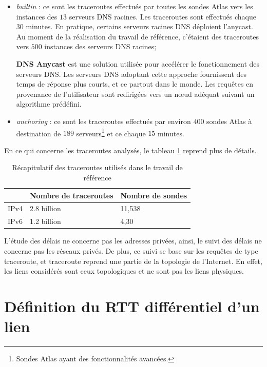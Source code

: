 \begin{itemize}
	\item \textit{builtin} : ce sont les traceroutes effectués par toutes les sondes Atlas vers les instances des  $13$ serveurs DNS racines. Les traceroutes sont effectués chaque $30$ minutes. En pratique, certains serveurs racines DNS déploient l'anycast. Au moment de la réalisation du travail de référence, c'étaient des traceroutes vers $ 500 $ instances des serveurs DNS racines;
	\begin{tcolorbox}
		\textbf{DNS Anycast} est une solution   utilisée pour accélérer le fonctionnement  des serveurs DNS. Les serveurs DNS adoptant cette approche fournissent des temps de réponse plus courts, et ce partout dans le monde. Les requêtes en provenance de l'utilisateur sont redirigées vers un n\oe{}ud adéquat suivant un algorithme prédéfini. 
	\end{tcolorbox}
	
	\item \textit{anchoring} : ce sont les traceroutes effectués par environ $400$ sondes Atlas à destination de $189$ serveurs\footnote{Sondes Atlas ayant des fonctionnalités avancées.} et ce chaque $15$ minutes.
\end{itemize}

En ce qui concerne les traceroutes analysés, le tableau \ref{tab:dataset} reprend plus de détails.

\begin{table}[H]
	\centering
	\begin{tabular}{|l|l|l|}
		\hline
		& \textbf{Nombre de traceroute}s& \textbf{Nombre de sondes}\\ \hline
		IPv4		&2.8 billion & 11,538\\ \hline
		IPv6	&	1.2 billion & 4,30 \\ \hline
	\end{tabular}
	\caption{Récapitulatif des traceroutes utilisés dans le travail de référence }
	\label{tab:dataset}
\end{table}


L'étude des délais ne concerne pas  les adresses privées, ainsi, le suivi des délais ne concerne pas les réseaux privés.  De plus, ce  suivi  se base sur les requêtes de type traceroute, et traceroute reprend une partie de la topologie de l'Internet. En effet, les liens considérés sont ceux topologiques et ne sont pas  les liens physiques. 

\section{Définition du RTT différentiel d'un lien}
